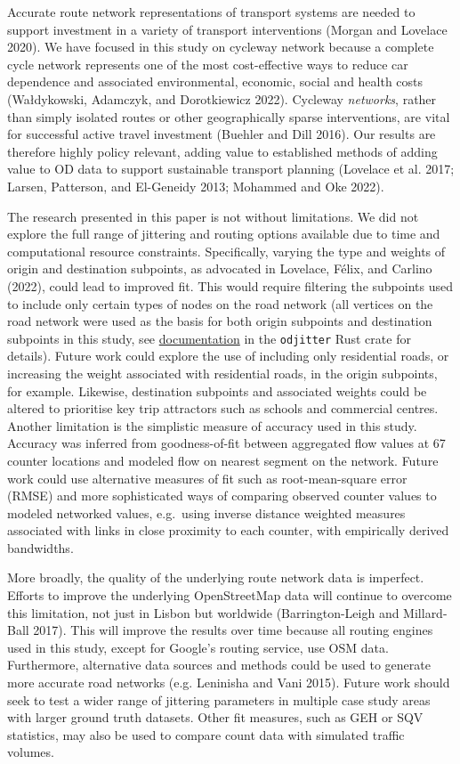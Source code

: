 \documentclass{isprs} %
\begin{document}
Accurate route network representations of transport systems are needed to support investment in a variety of transport interventions (Morgan and Lovelace 2020).
We have focused in this study on cycleway network because a complete cycle network represents one of the most cost-effective ways to reduce car dependence and associated environmental, economic, social and health costs (Wałdykowski, Adamczyk, and Dorotkiewicz 2022).
Cycleway \emph{networks}, rather than simply isolated routes or other geographically sparse interventions, are vital for successful active travel investment (Buehler and Dill 2016).
Our results are therefore highly policy relevant, adding value to established methods of adding value to OD data to support sustainable transport planning (Lovelace et al. 2017; Larsen, Patterson, and El-Geneidy 2013; Mohammed and Oke 2022).

The research presented in this paper is not without limitations.
We did not explore the full range of jittering and routing options available due to time and computational resource constraints.
Specifically, varying the type and weights of origin and destination subpoints, as advocated in Lovelace, Félix, and Carlino (2022), could lead to improved fit.
This would require filtering the subpoints used to include only certain types of nodes on the road network (all vertices on the road network were used as the basis for both origin subpoints and destination subpoints in this study, see \href{https://github.com/dabreegster/odjitter}{documentation} in the \texttt{odjitter} Rust crate for details).
Future work could explore the use of including only residential roads, or increasing the weight associated with residential roads, in the origin subpoints, for example.
Likewise, destination subpoints and associated weights could be altered to prioritise key trip attractors such as schools and commercial centres.
Another limitation is the simplistic measure of accuracy used in this study.
Accuracy was inferred from goodness-of-fit between aggregated flow values at 67 counter locations and modeled flow on nearest segment on the network.
Future work could use alternative measures of fit such as root-mean-square error (RMSE) and more sophisticated ways of comparing observed counter values to modeled networked values, e.g.~using inverse distance weighted measures associated with links in close proximity to each counter, with empirically derived bandwidths.

More broadly, the quality of the underlying route network data is imperfect.
Efforts to improve the underlying OpenStreetMap data will continue to overcome this limitation, not just in Lisbon but worldwide (Barrington-Leigh and Millard-Ball 2017).
This will improve the results over time because all routing engines used in this study, except for Google's routing service, use OSM data.
Furthermore, alternative data sources and methods could be used to generate more accurate road networks (e.g. Leninisha and Vani 2015).
Future work should seek to test a wider range of jittering parameters in multiple case study areas with larger ground truth datasets.
Other fit measures, such as GEH or SQV statistics, may also be used to compare count data with simulated traffic volumes.
\end{document}

